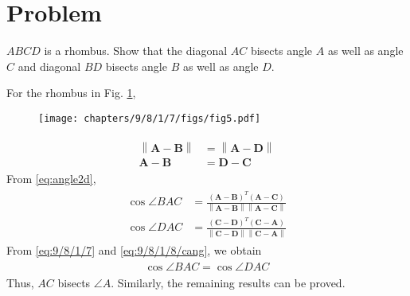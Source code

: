 \documentclass[10pt, a4paper]{article}
\providecommand{\norm}[1]{\left\lVert#1\right\rVert}
\let\vec\mathbf
\begin{document}
\title{\mytitle}
\author{\myauthor\hspace{1em}\\\contact\\FWC22008\hspace{6.5em}IITH\hspace{0.5em}\mymodule\hspace{6em}ASSIGN-4}
\date{}
	\maketitle
		
	\tableofcontents
\vspace{5mm}
   \section{Problem}
   \fi
$ABCD$ is a rhombus. Show that the diagonal $AC$ bisects angle $A$ as well as angle $C$ and diagonal $BD$ bisects angle $B$ as well as angle $D$. 
\\
\solution
\iffalse
}
   \section{Solution}
   \textbf{Theory:}\\

   Given  ABCD is a rhombus \\ 
  

\textbf{To Prove:} Diagonals bisects angles\\
\fi
%
For the rhombus in Fig. 
		\ref{fig:9/8/1/7},
 	\begin{figure}
		\centering
 \texttt{[image: chapters/9/8/1/7/figs/fig5.pdf]} 
		\caption{}
		\label{fig:9/8/1/7}
  	\end{figure}
\begin{align}
		\label{eq:9/8/1/7}
		\begin{split}
	\norm{\vec{A}-\vec{B}}&=\norm{\vec{A}-\vec{D}}
\\
	\vec{A}-\vec{B}&=\vec{D}-\vec{C}
		\end{split}
\end{align}
From 
    \eqref{eq:angle2d},
\begin{align}
		\begin{split}
	\cos \angle{BAC}
	&= \frac{(\vec{A}-\vec{B})^T(\vec{A}-\vec{C})}{\norm{\vec{A}-\vec{B}}\norm{\vec{A}-\vec{C}}}
	\\
\cos	\angle{DAC}
	 &= \frac{(\vec{C}-\vec{D})^T(\vec{C}-\vec{A})}{\norm{\vec{C}-\vec{D}}\norm{\vec{C}-\vec{A}}}
		\end{split}
	 \label{eq:9/8/1/8/cang}
%
\end{align}
From 
		\eqref{eq:9/8/1/7}
and
	 \eqref{eq:9/8/1/8/cang}, 
%
	 we obtain
\begin{align}
		\begin{split}
	\cos \angle{BAC}
	=\cos \angle{DAC}
		\end{split}
\end{align}
Thus, $AC$ bisects $\angle A$.  Similarly, the remaining results can be proved.
\end{document}
